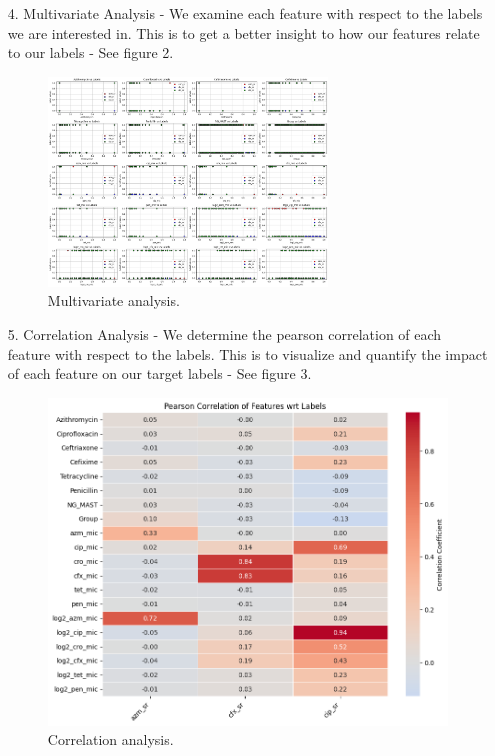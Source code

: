 \documentclass[manuscript,screen,review, nonacm]{acmart}
\begin{document}
\begin{itemize}
    \item[4.] Multivariate Analysis - We examine each feature with respect to the labels we are interested in. This is to get a better insight to how our
    features relate to our labels - See figure 2.
            \begin{figure}[H]
                \centering
                \vspace{-10pt}
                \includegraphics[width=0.7\textwidth]{figures/multivar.png}
                \caption{Multivariate analysis.}
                \vspace{-10pt}
            \end{figure}

    \item[5.] Correlation Analysis - We determine the pearson correlation of each feature with respect to the labels. This is to visualize and quantify the impact of each
    feature on our target labels - See figure 3.
            \begin{figure}[H]
                \centering
                \vspace{-15pt}
                \includegraphics[width=1\textwidth]{figures/corr.png}
                \caption{Correlation analysis.}
                \vspace{-15pt}
            \end{figure}


\end{itemize}
\end{document}

